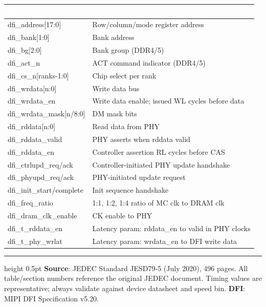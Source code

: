 \documentclass[10pt,a4paper,twoside]{article}
\newcommand{\thd}[1]{\cellcolor{navyblue}\textcolor{white}{\textbf{#1}}}
\newcommand{\trow}{\rowcolor{lightgray}}
\newcommand{\talt}{\rowcolor{skyblue!30}}
\begin{document}
\begin{center}
\begin{tabularx}{\linewidth}{@{} l X @{}}
\toprule
\thd{DFI Signal} & \thd{Function} \\
\midrule
\trow dfi\_address[17:0] & Row/column/mode register address \\
\talt dfi\_bank[1:0] & Bank address \\
\trow dfi\_bg[2:0] & Bank group (DDR4/5) \\
\talt dfi\_act\_n & ACT command indicator (DDR4/5) \\
\trow dfi\_cs\_n[ranks-1:0] & Chip select per rank \\
\talt dfi\_wrdata[n:0] & Write data bus \\
\trow dfi\_wrdata\_en & Write data enable; issued WL cycles before data \\
\talt dfi\_wrdata\_mask[n/8:0] & DM mask bits \\
\trow dfi\_rddata[n:0] & Read data from PHY \\
\talt dfi\_rddata\_valid & PHY asserts when rddata valid \\
\trow dfi\_rddata\_en & Controller assertion RL cycles before CAS \\
\talt dfi\_ctrlupd\_req/ack & Controller-initiated PHY update handshake \\
\trow dfi\_phyupd\_req/ack & PHY-initiated update request \\
\talt dfi\_init\_start/complete & Init sequence handshake \\
\trow dfi\_freq\_ratio & 1:1, 1:2, 1:4 ratio of MC clk to DRAM clk \\
\talt dfi\_dram\_clk\_enable & CK enable to PHY \\
\trow dfi\_t\_rddata\_en & Latency param: rddata\_en to valid in PHY clocks \\
\talt dfi\_t\_phy\_wrlat & Latency param: wrdata\_en to DFI write data \\
\bottomrule
\end{tabularx}
\end{center}

\vspace{10pt}
\hrule height 0.5pt
\vspace{4pt}
{\small\color{darkgray}
\textbf{Source}: JEDEC Standard JESD79-5 (July 2020), 496 pages.
All table/section numbers reference the original JEDEC document.
Timing values are representative; always validate against device datasheet and speed bin.
\textbf{DFI}: MIPI DFI Specification v5.20.}
\end{document}
